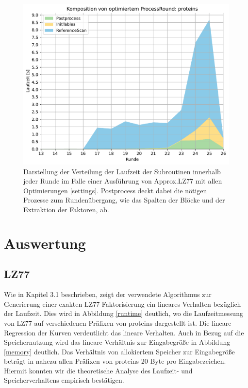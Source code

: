 \begin{figure}[H]
    \centering
    \includegraphics[scale=0.63]{Images/progressive_opt_stack.pdf}
    \caption{Darstellung der Verteilung der Laufzeit der Subroutinen innerhalb jeder Runde im Falle einer Ausführung von Approx.LZ77 mit allen Optimierungen \ref{settings}.
    Postprocess deckt dabei die nötigen Prozesse zum Rundenübergang, wie das Spalten der Blöcke und der Extraktion der Faktoren, ab.}
    \label{opt}
\end{figure}

\section{Auswertung}
\subsection{LZ77}
Wie in Kapitel 3.1 beschrieben, zeigt der verwendete Algorithmus zur Generierung einer exakten LZ77-Faktorisierung ein lineares Verhalten bezüglich der Laufzeit.
Dies wird in Abbildung \ref{runtime} deutlich, wo die Laufzeitmessung von LZ77 auf verschiedenen Präfixen von proteins dargestellt ist. Die lineare Regression der
Kurven verdeutlicht das lineare Verhalten. Auch in Bezug auf die Speichernutzung wird das lineare Verhältnis zur Eingabegröße in Abbildung \ref{memory} deutlich.
Das Verhältnis von allokiertem Speicher zur Eingabegröße beträgt in nahezu allen Präfixen von proteins 20 Byte pro Eingabezeichen. Hiermit konnten wir die theoretische
Analyse des Laufzeit- und Speicherverhaltens empirisch bestätigen.

